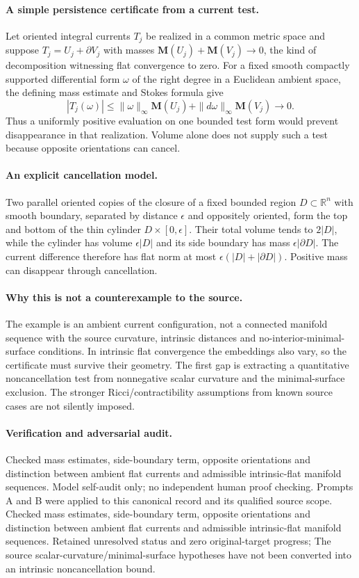\documentclass[11pt]{article}
\begin{document}
\paragraph{A simple persistence certificate from a current test.} Let oriented integral currents $T_j$ be realized in a common metric space and suppose $T_j=U_j+\partial V_j$ with masses $\mathbf M(U_j)+\mathbf M(V_j)\to0$, the kind of decomposition witnessing flat convergence to zero. For a fixed smooth compactly supported differential form $\omega$ of the right degree in a Euclidean ambient space, the defining mass estimate and Stokes formula give
\[
 |T_j(\omega)|\leq\|\omega\|_\infty\mathbf M(U_j)+\|d\omega\|_\infty\mathbf M(V_j)\to0.
\]
Thus a uniformly positive evaluation on one bounded test form would prevent disappearance in that realization. Volume alone does not supply such a test because opposite orientations can cancel.

\paragraph{An explicit cancellation model.} Two parallel oriented copies of the closure of a fixed bounded region $D\subset\mathbb R^n$ with smooth boundary, separated by distance $\epsilon$ and oppositely oriented, form the top and bottom of the thin cylinder $D\times[0,\epsilon]$. Their total volume tends to $2|D|$, while the cylinder has volume $\epsilon|D|$ and its side boundary has mass $\epsilon|\partial D|$. The current difference therefore has flat norm at most $\epsilon(|D|+|\partial D|)$. Positive mass can disappear through cancellation.

\paragraph{Why this is not a counterexample to the source.} The example is an ambient current configuration, not a connected manifold sequence with the source curvature, intrinsic distances and no-interior-minimal-surface conditions. In intrinsic flat convergence the embeddings also vary, so the certificate must survive their geometry. The first gap is extracting a quantitative noncancellation test from nonnegative scalar curvature and the minimal-surface exclusion. The stronger Ricci/contractibility assumptions from known source cases are not silently imposed.

\paragraph{Verification and adversarial audit.}
Checked mass estimates, side-boundary term, opposite orientations and distinction between ambient flat currents and admissible intrinsic-flat manifold sequences. Model self-audit only; no independent human proof checking. Prompts A and B were applied to this canonical record and its qualified source scope. Checked mass estimates, side-boundary term, opposite orientations and distinction between ambient flat currents and admissible intrinsic-flat manifold sequences. Retained unresolved status and zero original-target progress; The source scalar-curvature/minimal-surface hypotheses have not been converted into an intrinsic noncancellation bound.
\end{document}
